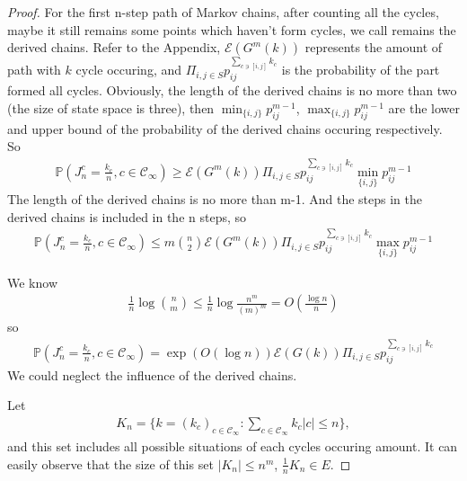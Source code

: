 \documentclass[11pt,en,cite=authoryear]{elegantpaper}
\begin{document}
\begin{proof}
    For the first n-step path of Markov chains, after counting all the cycles, maybe it still remains some points which haven't form cycles, we call remains the derived chains.
    Refer to the Appendix, $\mathcal{E} (G^m(k))$ represents the amount of path with $k$ cycle occuring, and $\Pi_{i,j \in S} p_{ij}^{\sum_{c \ni [i,j]} k_{c}} $ is the probability of the part formed all cycles. Obviously, the length of the derived chains is no more than two (the size of state space is three), then
    $\min_{\{i, j\}} p_{ij}^{m-1}$, $\max_{\{i, j\}} p_{ij}^{m-1}$ are the lower and upper bound of the probability of the derived chains occuring respectively. So
    \begin{align*}
        \mathbb{P}(J_{n}^c= \frac{k_c}{n}, c \in \mathcal{C}_{\infty}) 
        \ge \mathcal{E} (G^m(k)) \Pi_{i,j \in S} p_{ij}^{\sum_{c \ni [i,j]} k_{c}}
        \min_{\{i, j\}} p_{ij}^{m-1}
    \end{align*}
    The length of the derived chains is no more than m-1. And the steps in the derived chains is included in the n steps, so
    \begin{align*}
        \mathbb{P}(J_{n}^c = \frac{k_c}{n}, c \in \mathcal{C}_{\infty}) 
        \le m\binom{n}{2}
        \mathcal{E} (G^m(k)) \Pi_{i,j \in S} p_{ij}^{\sum_{c \ni [i,j]} k_{c}}
        \max_{\{i, j\}} p_{ij}^{m-1}
    \end{align*}

    We know
    \begin{align*}
        \frac{1}{n} \log \binom{n}{m} \le \frac{1}{n} \log \frac{n^m}{(m)^{m}}
        = O(\frac{\log n}{n})
    \end{align*}
    so 
    \begin{align*}
        \mathbb{P}(J_{n}^c = \frac{k_c}{n}, c \in \mathcal{C}_{\infty}) 
        = \exp(O (\log n))
        \mathcal{E} (G(k)) \Pi_{i,j \in S} p_{ij}^{\sum_{c \ni [i,j]} k_{c}}
    \end{align*}
    We could neglect the influence of the derived chains.

    Let
    \begin{align*}
        K_n = \biggl\{k=(k_c)_{c\in \mathcal{C}_{\infty}}: \sum_{c \in \mathcal{C}_{\infty}} k_{c} |c| \le n \biggr\},
    \end{align*}
    and this set includes all possible situations of each cycles occuring amount. It can easily observe that the size of this set $|K_n| \le n^m$, $\frac{1}{n} K_n \in E$. 


\end{proof}
\end{document}
